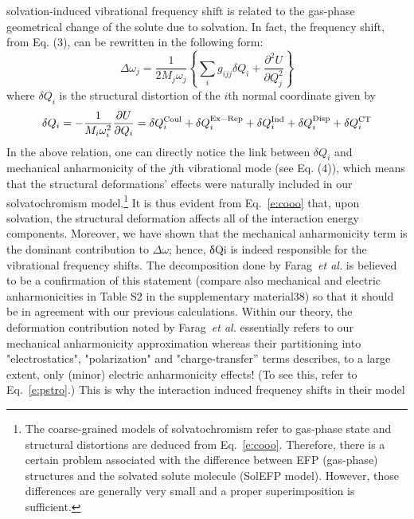 \documentclass[a4paper,titlepage,twoside,fleqn,12pt]{book}
\newcommand{\fderiv}[2]{\ensuremath{
\frac{\partial #1}{\partial #2}}}
\newcommand{\sderiv}[2]{\ensuremath{
\frac{\partial^2 #1}{\partial #2^2}
}}
\begin{document}
\begin{refsection}
solvation\hyp{}induced vibrational frequency shift is related to the
gas\hyp{}phase geometrical change of the solute due to solvation.
In fact, the frequency shift, from Eq. (3), can be rewritten in
the following form:
%
\begin{equation} \label{e:pstro}
\Delta\omega_j = \frac{1}{2M_j\omega_j} \left\{
  \sum_i g_{ijj} \delta Q_i + \sderiv{U}{Q_j}
\right\}
\end{equation}
%
where $\delta Q_i$ is the structural distortion of the $i$th normal
coordinate given by
%
\begin{equation} \label{e:cooo}
 \delta Q_i = -\frac{1}{M_i\omega_i^2} \fderiv{U}{Q_i} 
            = \delta Q_i^{\rm Coul} +
              \delta Q_i^{\rm Ex-Rep} +
              \delta Q_i^{\rm Ind} +
              \delta Q_i^{\rm Disp} +
              \delta Q_i^{\rm CT}
\end{equation}
%
In the above relation, one can directly notice the link between
$\delta Q_i$ and mechanical anharmonicity of the $j$th vibrational mode
(see Eq. (4)), which means that the structural deformations’
effects were naturally included in our solvatochromism
model.\footnote{The coarse\hyp{}grained models of solvatochromism 
refer to gas\hyp{}phase state and structural distortions are deduced 
from Eq.~\eqref{e:cooo}. Therefore, there is a certain problem associated with 
the difference between EFP (gas\hyp{}phase) structures and the solvated 
solute molecule (SolEFP model). However, those differences are generally 
very small and a proper superimposition is sufficient.} 
It is thus evident from Eq.~\eqref{e:cooo} that, upon solvation,
the structural deformation affects all of the interaction energy
components. Moreover, we have shown that the mechanical
anharmonicity term is the dominant contribution to $\Delta\omega$; hence,
δQi is indeed responsible for the vibrational frequency shifts.
The decomposition done by Farag~\emph{et al.} is believed to be
a confirmation of this statement (compare also mechanical
and electric anharmonicities in Table S2 in the supplementary
material38) so that it should be in agreement with our previous
calculations. Within our theory, the deformation contribution
noted by Farag~\emph{et al.} essentially refers to our mechanical
anharmonicity approximation whereas their partitioning into
"electrostatics", "polarization" and "charge\hyp{}transfer” terms
describes, to a large extent, only (minor) electric anharmonicity
effects! (To see this, refer to Eq.~\eqref{e:pstro}.) This is
why the interaction induced frequency shifts in their model

\end{refsection}
\end{document}
